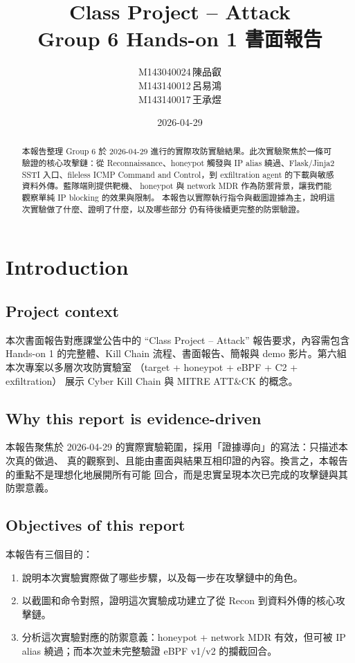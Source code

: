 \documentclass[UTF8,11pt]{ctexart}
\title{Class Project -- Attack\\\large Group 6 Hands-on 1 書面報告}
\author{M143040024\,陳品叡\\M143140012\,呂易鴻\\M143140017\,王承煜}
\date{2026-04-29}
\begin{document}
\maketitle

\begin{abstract}
本報告整理 Group 6 於 2026-04-29 進行的實際攻防實驗結果。此次實驗聚焦於一條可驗證的核心攻擊鏈：從
Reconnaissance、honeypot 觸發與 IP alias 繞過、Flask/Jinja2 SSTI 入口、fileless ICMP
Command and Control，到 exfiltration agent 的下載與敏感資料外傳。藍隊端則提供靶機、
honeypot 與 network MDR 作為防禦背景，讓我們能觀察單純 IP blocking 的效果與限制。
本報告以實際執行指令與截圖證據為主，說明這次實驗做了什麼、證明了什麼，以及哪些部分
仍有待後續更完整的防禦驗證。
\end{abstract}

\tableofcontents
\newpage

\section{Introduction}

\subsection{Project context}
本次書面報告對應課堂公告中的 ``Class Project -- Attack'' 報告要求，內容需包含 Hands-on 1
的完整體、Kill Chain 流程、書面報告、簡報與 demo 影片。第六組本次專案以多層次攻防實驗室
（target + honeypot + eBPF + C2 + exfiltration）
展示 Cyber Kill Chain 與 MITRE ATT\&CK 的概念。

\subsection{Why this report is evidence-driven}
本報告聚焦於 2026-04-29 的實際實驗範圍，採用「證據導向」的寫法：只描述本次真的做過、
真的觀察到、且能由畫面與結果互相印證的內容。換言之，本報告的重點不是理想化地展開所有可能
回合，而是忠實呈現本次已完成的攻擊鏈與其防禦意義。

\subsection{Objectives of this report}
本報告有三個目的：
\begin{enumerate}[leftmargin=*]
  \item 說明本次實驗實際做了哪些步驟，以及每一步在攻擊鏈中的角色。
  \item 以截圖和命令對照，證明這次實驗成功建立了從 Recon 到資料外傳的核心攻擊鏈。
  \item 分析這次實驗對應的防禦意義：honeypot + network MDR 有效，但可被 IP alias 繞過；而本次並未完整驗證 eBPF v1/v2 的攔截回合。
\end{enumerate}
\end{document}
